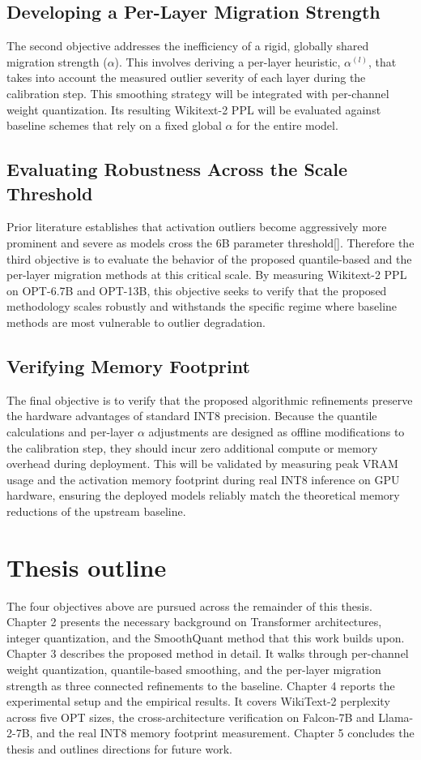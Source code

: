 \subsection{Developing a Per-Layer Migration Strength}
The second objective addresses the inefficiency of a rigid, globally shared migration strength ($\alpha$). This involves deriving a per-layer heuristic, $\alpha^{(l)}$, that takes into account the measured outlier severity of each layer during the calibration step. This smoothing strategy will be integrated with per-channel weight quantization. Its resulting Wikitext-2 PPL will be evaluated against baseline schemes that rely on a fixed global $\alpha$ for the entire model.

\subsection{Evaluating Robustness Across the Scale Threshold}
Prior literature establishes that activation outliers become aggressively more prominent and severe as models cross the 6B parameter threshold[]. Therefore the third objective is to evaluate the behavior of the proposed quantile-based and the per-layer migration methods at this critical scale. By measuring Wikitext-2 PPL on OPT-6.7B and OPT-13B, this objective seeks to verify that the proposed methodology scales robustly and withstands the specific regime where baseline methods are most vulnerable to outlier degradation.

\subsection{Verifying Memory Footprint}
The final objective is to verify that the proposed algorithmic refinements preserve the hardware advantages of standard INT8 precision. Because the quantile calculations and per-layer $\alpha$ adjustments are designed as offline modifications to the calibration step, they should incur zero additional compute or memory overhead during deployment. This will be validated by measuring peak VRAM usage and the activation memory footprint during real INT8 inference on GPU hardware, ensuring the deployed models reliably match the theoretical memory reductions of the upstream baseline.

\section{Thesis outline}

The four objectives above are pursued across the remainder of this thesis. Chapter 2 presents the necessary background on Transformer architectures, integer quantization, and the SmoothQuant method that this work builds upon. Chapter 3 describes the proposed method in detail. It walks through per-channel weight quantization, quantile-based smoothing, and the per-layer migration strength as three connected refinements to the baseline. Chapter 4 reports the experimental setup and the empirical results. It covers WikiText-2 perplexity across five OPT sizes, the cross-architecture verification on Falcon-7B and Llama-2-7B, and the real INT8 memory footprint measurement. Chapter 5 concludes the thesis and outlines directions for future work.
